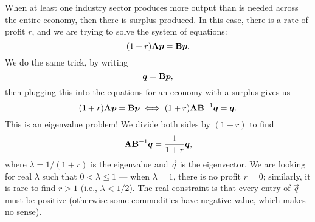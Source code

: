 When at least one industry sector produces more output than is needed
across the entire economy, then there is surplus produced. In this case,
there is a rate of profit $r$, and we are trying to solve the system of
equations:
\begin{equation}
(1+r)\mathbf{A}\boldsymbol{p} = \mathbf{B}\boldsymbol{p}.
\end{equation}
We do the same trick, by writing
\begin{equation}
\boldsymbol{q} = \mathbf{B}\boldsymbol{p},
\end{equation}
then plugging this into the equations for an economy with a surplus
gives us
\begin{equation}
(1+r)\mathbf{A}\boldsymbol{p} = \mathbf{B}\boldsymbol{p} \iff (1+r)\mathbf{A}\mathbf{B}^{-1}\boldsymbol{q}=\boldsymbol{q}.
\end{equation}
This is an eigenvalue problem! We divide both sides by $(1+r)$ to find
\begin{equation}
\mathbf{A}\mathbf{B}^{-1}\boldsymbol{q}=\frac{1}{1+r}\boldsymbol{q},
\end{equation}
where $\lambda=1/(1+r)$ is the eigenvalue and $\vec{q}$ is the
eigenvector. We are looking for real $\lambda$ such that
$0<\lambda\leq1$ --- when $\lambda=1$, there is no profit $r=0$;
similarly, it is rare to find $r>1$ (i.e., $\lambda<1/2$). The real
constraint is that every entry of $\vec{q}$ must be positive (otherwise
some commodities have negative value, which makes no sense).

